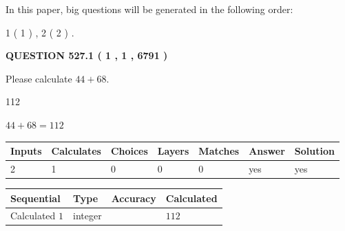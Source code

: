 \documentclass[12pt]{article}
\begin{document}
In this paper, big questions will be generated in the following order: 
   
   
   1 ( 1 )
 ,
   2 ( 2 )
 .
  
\vspace{0.2in}
  
{\textbf{\Large{QUESTION
527.1 
 ( 1 , 1 , 6791 )
}}}
  
  
 
Please calculate $ %
44 +  %
68 $.
 
 
 
\noindent{}
 
 

112
 
 
\noindent{}
 
 

 
 
 
\noindent{}
 
 

$ %
44 +  %
68=   %
112$
 
 
\noindent{}
 
 

 
   
   
   
   
\noindent\begin{tabular}{|l|l|l|l|l|l|l|}
 \hline
Inputs & Calculates & Choices & Layers & Matches & Answer & Solution \\ \hline
 2  & 
 1  & 
 0
  & 
 0  & 
 0  & 
  yes & 
  yes 
  \\ \hline
 \end{tabular}
   
   
   
   
\noindent{}
   
   
  
  
\noindent\begin{tabular}{|l|l|l|l|}
\hline
 Sequential & Type & Accuracy & Calculated \\ 
\hline
 
 
  Calculated $  1 $ & integer &  & 
  $ 112 $ 
 \\  \hline  
 \end{tabular}
   
\end{document}

